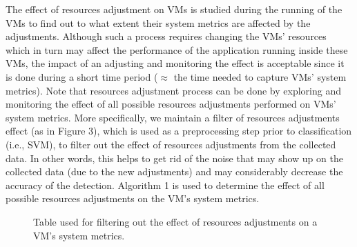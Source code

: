 \documentclass[twocolumn]{bmcart}%
\begin{document}
The effect of resources adjustment on VMs is studied during the running of the VMs to find out to what extent their system metrics are affected by the adjustments. Although such a process requires changing the VMs' resources which in turn may affect the performance of the application running inside these VMs, the impact of an adjusting and monitoring the effect is acceptable since it is done during a short time period ($\approx$ the time needed to capture VMs' system metrics). Note that resources adjustment process can be done by exploring and monitoring the effect of all possible resources adjustments performed on VMs' system metrics. More specifically, we maintain a filter of resources adjustments effect (as in Figure 3), which is used as a preprocessing step prior to classification (i.e., SVM), to filter out the effect of resources adjustments from the collected data. In other words, this helps to get rid of the noise that may show up on the collected data (due to the new adjustments) and may considerably decrease the accuracy of the detection. Algorithm 1 is used to determine the effect of all possible resources adjustments on the VM's system metrics.



\begin{figure}[!ht]
    \center
	\vspace{-10mm}
    \label{fig1}
    \caption{Table used for filtering out the effect of resources adjustments on a VM's system metrics.}
\end{figure}
\end{document}
